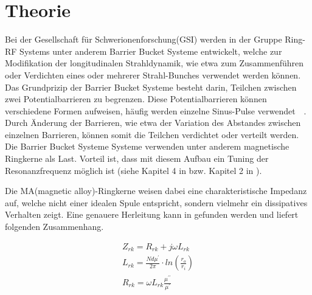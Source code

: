 \section{Theorie}

Bei der Gesellschaft für Schwerionenforschung(GSI) werden in der Gruppe Ring-RF Systems unter anderem  Barrier Bucket Systeme entwickelt, welche zur Modifikation der longitudinalen Strahldynamik, wie etwa zum Zusammenf\"uhren oder Verdichten eines oder mehrerer Strahl-Bunches verwendet werden k\"onnen. 
Das Grundprizip der Barrier Bucket Systeme besteht darin, Teilchen zwischen zwei Potentialbarrieren zu begrenzen. Diese Potentialbarrieren k\"onnen verschiedene Formen aufweisen, h\"aufig werden einzelne Sinus-Pulse verwendet~\citep{harzheim2016modeling}~\citep{lee1997particle}. Durch \"Anderung der Barrieren, wie etwa der Variation des Abstandes zwischen einzelnen Barrieren, k\"onnen somit die Teilchen verdichtet oder verteilt werden.
Die Barrier Bucket Systeme Systeme verwenden unter anderem magnetische Ringkerne als Last. Vorteil ist, dass mit diesem Aufbau ein Tuning der Resonanzfrequenz m\"oglich ist (siehe Kapitel 4 in \citep{Klingbeil2015} bzw. Kapitel 2 in \citep{bast2017ba}).
\par
Die MA(magnetic alloy)-Ringkerne weisen dabei eine charakteristische Impedanz auf, welche nicht einer idealen Spule entspricht, sondern vielmehr ein dissipatives Verhalten zeigt. Eine genauere Herleitung kann in \citep{Klingbeil2015} gefunden werden und liefert folgenden Zusammenhang. 


\begin{align}
Z_{rk} = R_{rk} + j\omega L_{rk}\label{eq_01}\\
L_{rk} = \frac{Nd\mu^\prime}{2\pi}\cdot ln(\frac{r_o}{r_i})\label{eq_02}\\
R_{rk} = \omega L_{rk} \frac{\mu^{\prime\prime}}{\mu^{\prime}}\label{eq_03}
\end{align}



